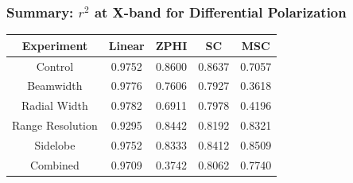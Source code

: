 \documentclass[red]{beamer}
\begin{document}
\begin{frame}
    \frametitle{Summary: $r^2$ at X-band for Differential Polarization}
    \begin{center}
        \begin{tabular}{| c | c | c | c | c |}
            \hline
            Experiment & Linear & ZPHI & SC & MSC \\
            \hline
            \hline
            Control & 0.9752 & 0.8600 & 0.8637 & 0.7057 \\
            Beamwidth & 0.9776 & 0.7606 & 0.7927 & 0.3618 \\
            Radial Width & 0.9782 & 0.6911 & 0.7978 & 0.4196 \\
            Range Resolution & 0.9295 & 0.8442 & 0.8192 & 0.8321 \\
            Sidelobe & 0.9752 & 0.8333 & 0.8412 & 0.8509 \\
            Combined & 0.9709 & 0.3742 & 0.8062 & 0.7740 \\
            \hline
        \end{tabular}
    \end{center}
\end{frame}

\setcounter{framenumber}{\value{finalframe}}
\end{document}
